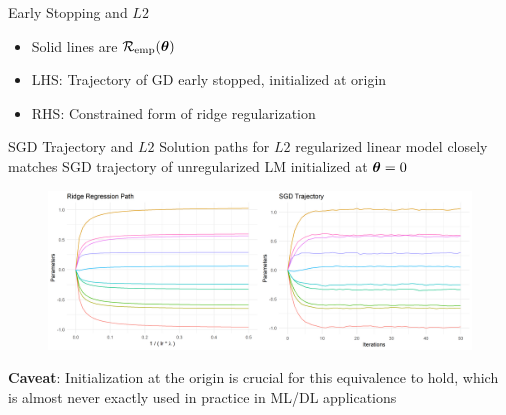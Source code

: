 \documentclass[11pt,compress,t,notes=noshow, xcolor=table]{beamer}
\begin{document}
\begin{vbframe}{Early Stopping and $L2$ }
\begin{itemize}
\item Solid lines are $\mathcal{R}_{\text{emp}}(\bm{\theta})$ 
\item LHS: Trajectory of GD early stopped, initialized at origin
\item RHS: Constrained form of ridge regularization
\end{itemize}

\end{vbframe}

\begin{vbframe}{SGD Trajectory and $L2$ }
Solution paths for $L2$ regularized linear model closely matches SGD trajectory of unregularized LM initialized at $\bm{\theta}=0$ 
\lz
  \begin{figure}
    \centering
      {\includegraphics{figure/ridge_vs_sgd_path.png}}
  \end{figure}

\textbf{Caveat}: Initialization at the origin is crucial for this equivalence to hold, which is almost never exactly used in practice in ML/DL applications

\end{vbframe}

\endlecture
\end{document}

